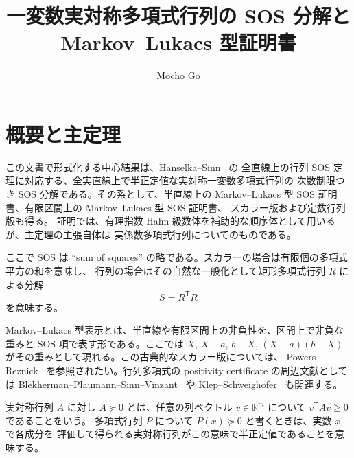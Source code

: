 \documentclass[uplatex,dvipdfmx]{jsarticle}
\title{一変数実対称多項式行列の SOS 分解と Markov--Lukacs 型証明書}
\author{Mocho Go}
\date{}
\newcommand{\psd}{\succeq 0}
\theoremstyle{matrixsosdefinition}
\begin{document}
\maketitle

\section{概要と主定理}

この文書で形式化する中心結果は、Hanselka--Sinn~\cite{HanselkaSinn} の
全直線上の行列 SOS 定理に対応する、全実直線上で半正定値な実対称一変数多項式行列の
次数制限つき SOS 分解である。その系として、半直線上の
Markov--Lukacs 型 SOS 証明書、有限区間上の Markov--Lukacs 型 SOS 証明書、
スカラー版および定数行列版も得る。
証明では、有理指数 Hahn 級数体を補助的な順序体として用いるが、主定理の主張自体は
実係数多項式行列についてのものである。

ここで SOS は ``sum of squares'' の略である。スカラーの場合は有限個の多項式平方の和を意味し、
行列の場合はその自然な一般化として矩形多項式行列 \(R\) による分解
\[
  S=R^{\mathsf T}R
\]
を意味する。

Markov--Lukacs 型表示とは、半直線や有限区間上の非負性を、区間上で非負な重みと
SOS 項で表す形である。ここでは \(X\), \(X-a\), \(b-X\),
\((X-a)(b-X)\) がその重みとして現れる。この古典的なスカラー版については、
Powers--Reznick~\cite{PowersReznick} を参照されたい。行列多項式の
positivity certificate の周辺文献としては
Blekherman--Plaumann--Sinn--Vinzant~\cite{BPSV} や
Klep--Schweighofer~\cite{KlepSchweighofer} も関連する。

実対称行列 \(A\) に対し \(A\psd\) とは、任意の列ベクトル
\(v\in\mathbb{R}^m\) について \(v^{\mathsf T}Av\ge0\) であることをいう。
多項式行列 \(P\) について \(P(x)\psd\) と書くときは、実数 \(x\) で各成分を
評価して得られる実対称行列がこの意味で半正定値であることを意味する。
\end{document}
